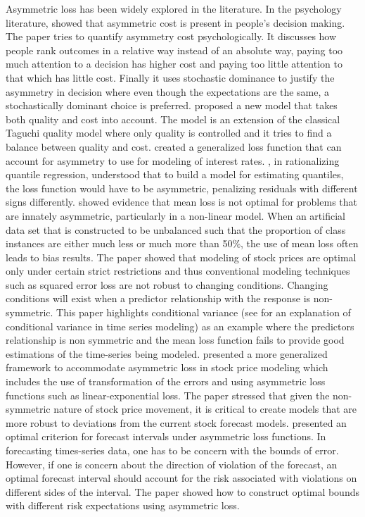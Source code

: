 Asymmetric loss has been widely explored in the literature. In the psychology literature, \citet{Weber94} showed that asymmetric cost is present in people's decision making. The paper tries to quantify asymmetry cost psychologically. It discusses how people rank outcomes in a relative way instead of an absolute way, paying too much attention to a decision has higher cost and paying too little attention to that which has little cost. Finally it uses stochastic dominance to justify the asymmetry in decision where even though the expectations are the same, a stochastically dominant choice is preferred. \citet{Huang01} proposed a new model that takes both quality and cost into account. The model is an extension of the classical Taguchi \citep{Taguchi95} quality model where only quality is controlled and it tries to find a balance between quality and cost. \citet{McCullough00} created a generalized loss function that can account for asymmetry to use for modeling of interest rates. \citet{Koenker01}, in rationalizing quantile regression, understood that to build a model for estimating quantiles, the loss function would have to be asymmetric, penalizing residuals with different signs differently. \citet{Pattona06} showed evidence that mean loss is not optimal for problems that are innately asymmetric, particularly in a non-linear model. When an artificial data set that is constructed to be unbalanced such that the proportion of class instances are either much less or much more than 50\%, the use of mean loss often leads to bias results. The paper showed that modeling of stock prices are optimal only under certain strict restrictions and thus conventional modeling techniques such as squared error loss are not robust to changing conditions. Changing conditions will exist when a predictor relationship with the response is non-symmetric. This paper highlights conditional variance (see \citet{Hentschel95} for an explanation of conditional variance in time series modeling) as an example where the predictors relationship is non symmetric and the mean loss function fails to provide good estimations of the time-series being modeled. \citet{Pattona06} presented a more generalized framework to accommodate asymmetric loss in stock price modeling which includes the use of transformation of the errors and using asymmetric loss functions such as linear-exponential loss. The paper stressed that given the non-symmetric nature of stock price movement, it is critical to create models that are more robust to deviations from the current stock forecast models. \citet{Demetrescu07} presented an optimal criterion for forecast intervals under asymmetric loss functions. In forecasting times-series data, one has to be concern with the bounds of error. However, if one is concern about the direction of violation of the forecast, an optimal forecast interval should account for the risk associated with violations on different sides of the interval. The paper showed how to construct optimal bounds with different risk expectations using asymmetric loss. 

